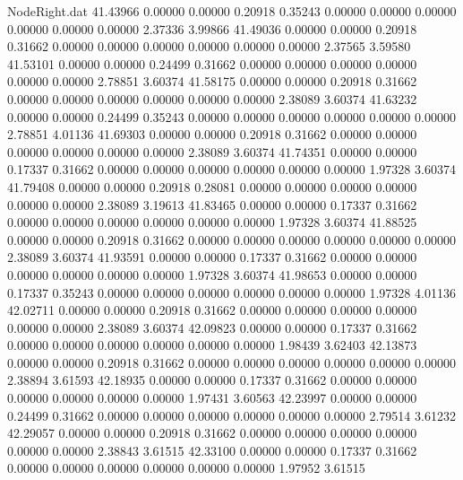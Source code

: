 \begin{filecontents}{NodeRight.dat}
  41.43966    0.00000    0.00000     0.20918    0.35243    0.00000    0.00000    0.00000    0.00000    0.00000    0.00000    2.37336    3.99866
  41.49036    0.00000    0.00000     0.20918    0.31662    0.00000    0.00000    0.00000    0.00000    0.00000    0.00000    2.37565    3.59580
  41.53101    0.00000    0.00000     0.24499    0.31662    0.00000    0.00000    0.00000    0.00000    0.00000    0.00000    2.78851    3.60374
  41.58175    0.00000    0.00000     0.20918    0.31662    0.00000    0.00000    0.00000    0.00000    0.00000    0.00000    2.38089    3.60374
  41.63232    0.00000    0.00000     0.24499    0.35243    0.00000    0.00000    0.00000    0.00000    0.00000    0.00000    2.78851    4.01136
  41.69303    0.00000    0.00000     0.20918    0.31662    0.00000    0.00000    0.00000    0.00000    0.00000    0.00000    2.38089    3.60374
  41.74351    0.00000    0.00000     0.17337    0.31662    0.00000    0.00000    0.00000    0.00000    0.00000    0.00000    1.97328    3.60374
  41.79408    0.00000    0.00000     0.20918    0.28081    0.00000    0.00000    0.00000    0.00000    0.00000    0.00000    2.38089    3.19613
  41.83465    0.00000    0.00000     0.17337    0.31662    0.00000    0.00000    0.00000    0.00000    0.00000    0.00000    1.97328    3.60374
  41.88525    0.00000    0.00000     0.20918    0.31662    0.00000    0.00000    0.00000    0.00000    0.00000    0.00000    2.38089    3.60374
  41.93591    0.00000    0.00000     0.17337    0.31662    0.00000    0.00000    0.00000    0.00000    0.00000    0.00000    1.97328    3.60374
  41.98653    0.00000    0.00000     0.17337    0.35243    0.00000    0.00000    0.00000    0.00000    0.00000    0.00000    1.97328    4.01136
  42.02711    0.00000    0.00000     0.20918    0.31662    0.00000    0.00000    0.00000    0.00000    0.00000    0.00000    2.38089    3.60374
  42.09823    0.00000    0.00000     0.17337    0.31662    0.00000    0.00000    0.00000    0.00000    0.00000    0.00000    1.98439    3.62403
  42.13873    0.00000    0.00000     0.20918    0.31662    0.00000    0.00000    0.00000    0.00000    0.00000    0.00000    2.38894    3.61593
  42.18935    0.00000    0.00000     0.17337    0.31662    0.00000    0.00000    0.00000    0.00000    0.00000    0.00000    1.97431    3.60563
  42.23997    0.00000    0.00000     0.24499    0.31662    0.00000    0.00000    0.00000    0.00000    0.00000    0.00000    2.79514    3.61232
  42.29057    0.00000    0.00000     0.20918    0.31662    0.00000    0.00000    0.00000    0.00000    0.00000    0.00000    2.38843    3.61515
  42.33100    0.00000    0.00000     0.17337    0.31662    0.00000    0.00000    0.00000    0.00000    0.00000    0.00000    1.97952    3.61515

\end{filecontents}
